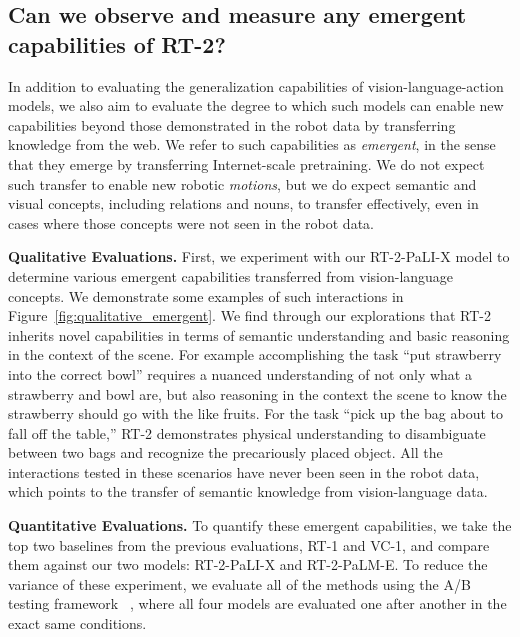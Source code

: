 \documentclass[11pt, a4paper, logo, copyright]{deepmind}
\newcommand{\methodname}{RT-2\xspace}
\begin{document}
\subsection{Can we observe and measure any emergent capabilities of \methodname?}
\label{sec:emergent}
In addition to evaluating the generalization capabilities of vision-language-action models, we also aim to evaluate the degree to which such models can enable new capabilities beyond those demonstrated in the robot data by transferring knowledge from the web. We refer to such capabilities as \emph{emergent}, in the sense that they emerge by transferring Internet-scale pretraining. We do not expect such transfer to enable new robotic \emph{motions}, but we do expect semantic and visual concepts, including relations and nouns, to transfer effectively, even in cases where those concepts were not seen in the robot data. 

\textbf{Qualitative Evaluations.} First, we experiment with our \methodname-PaLI-X model to determine various emergent capabilities transferred from vision-language concepts. We demonstrate some examples of such interactions in Figure~\ref{fig:qualitative_emergent}.
We find through our explorations that \methodname inherits novel capabilities in terms of semantic understanding and basic reasoning in the context of the scene.
For example accomplishing the task ``put strawberry into the correct bowl'' requires a nuanced understanding of not only what a strawberry and bowl are, but also reasoning in the context the scene to know the strawberry should go with the like fruits.
For the task ``pick up the bag about to fall off the table,'' \methodname demonstrates physical understanding to disambiguate between two bags and recognize the precariously placed object.
All the interactions tested in these scenarios have never been seen in the robot data, which points to the transfer of semantic knowledge from vision-language data.

\textbf{Quantitative Evaluations.}
To quantify these emergent capabilities, we take the top two baselines from the previous evaluations, RT-1 and VC-1, and compare them against our two models: \methodname-PaLI-X and \methodname-PaLM-E. To reduce the variance of these experiment, we evaluate all of the methods using the A/B testing framework~\citep{fisher1936design}%
, where all four models are evaluated one after another in the exact same conditions.
\end{document}
